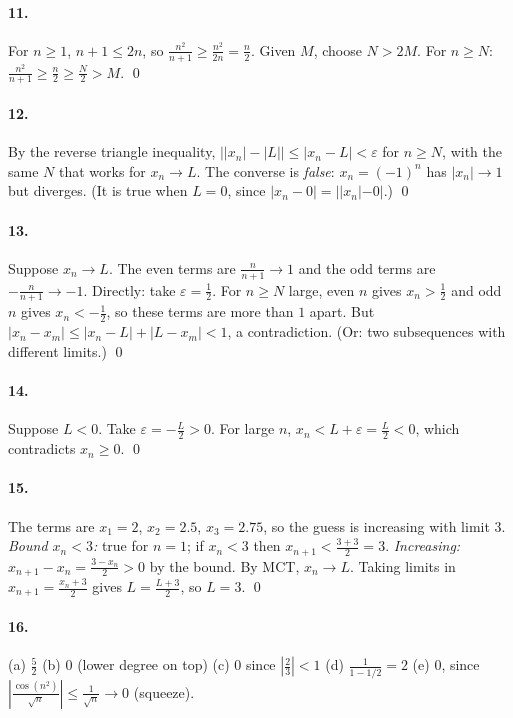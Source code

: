 \documentclass[11pt]{article}
\theoremstyle{definition}
\newcommand{\eps}{\varepsilon}
\begin{document}
\paragraph{11.} For $n\ge1$, $n+1\le2n$, so $\frac{n^2}{n+1}\ge\frac{n^2}{2n}=\frac n2$.
Given $M$, choose $N>2M$. For $n\ge N$: $\frac{n^2}{n+1}\ge\frac n2\ge\frac N2>M$. \qed

\paragraph{12.} By the reverse triangle inequality,
$\bigl||x_n|-|L|\bigr|\le|x_n-L|<\eps$ for $n\ge N$, with the same $N$ that
works for $x_n\to L$. The converse is \emph{false}: $x_n=(-1)^n$ has
$|x_n|\to1$ but diverges. (It is true when $L=0$, since $|x_n-0|=||x_n|-0|$.) \qed

\paragraph{13.} Suppose $x_n\to L$. The even terms are
$\frac{n}{n+1}\to1$ and the odd terms are $-\frac n{n+1}\to-1$. Directly:
take $\eps=\frac12$. For $n\ge N$ large, even $n$ gives $x_n>\frac12$ and
odd $n$ gives $x_n<-\frac12$, so these terms are more than $1$ apart. But
$|x_n-x_m|\le|x_n-L|+|L-x_m|<1$, a contradiction. (Or: two subsequences
with different limits.) \qed

\paragraph{14.} Suppose $L<0$. Take $\eps=-\frac L2>0$. For large $n$,
$x_n<L+\eps=\frac L2<0$, which contradicts $x_n\ge0$. \qed

\paragraph{15.} The terms are $x_1=2$, $x_2=2.5$, $x_3=2.75$, so the guess
is increasing with limit $3$.
\emph{Bound $x_n<3$:} true for $n=1$; if $x_n<3$ then $x_{n+1}<\frac{3+3}2=3$.
\emph{Increasing:} $x_{n+1}-x_n=\frac{3-x_n}{2}>0$ by the bound.
By MCT, $x_n\to L$. Taking limits in $x_{n+1}=\frac{x_n+3}2$ gives
$L=\frac{L+3}2$, so $L=3$. \qed

\paragraph{16.} (a) $\frac52$ \quad (b) $0$ (lower degree on top) \quad
(c) $0$ since $|\frac23|<1$ \quad (d) $\frac1{1-1/2}=2$ \quad
(e) $0$, since $\left|\frac{\cos(n^2)}{\sqrt n}\right|\le\frac1{\sqrt n}\to0$ (squeeze).
\end{document}

